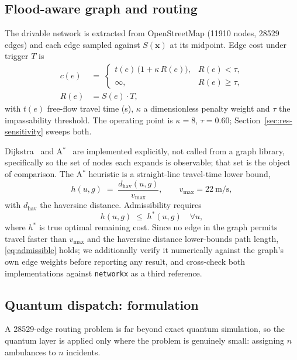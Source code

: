 \documentclass[10pt,twocolumn]{article}
\newcommand{\Sx}{S(\mathbf{x})}
\begin{document}
\subsection{Flood-aware graph and routing}
\label{sec:method-routing}
The drivable network is extracted from OpenStreetMap (\num{11910} nodes,
\num{28529} edges) and each edge sampled against $\Sx$ at its midpoint. Edge cost
under trigger $T$ is
\begin{align}
c(e) \;&=\;
\begin{cases}
t(e)\,\bigl(1+\kappa\,R(e)\bigr), & R(e) < \tau,\\[2pt]
\infty, & R(e) \ge \tau,
\end{cases} \nonumber\\[2pt]
R(e) &= S(e)\cdot T,
\label{eq:edgecost}
\end{align}
with $t(e)$ free-flow travel time (\si{\second}), $\kappa$ a dimensionless
penalty weight and $\tau$ the impassability threshold. The operating point is
$\kappa=8$, $\tau=0.60$; Section~\ref{sec:res-sensitivity} sweeps both.

Dijkstra~\citep{dijkstra1959} and A$^\ast$~\citep{hart1968} are implemented
explicitly, not called from a graph library, specifically so the set of
nodes each expands is observable; that set is the object of comparison. The
A$^\ast$ heuristic is a straight-line travel-time lower bound,
\begin{equation}
h(u,g) \;=\; \frac{d_{\mathrm{hav}}(u,g)}{v_{\max}},
\qquad v_{\max}=\SI{22}{\metre\per\second},
\label{eq:heuristic}
\end{equation}
with $d_{\mathrm{hav}}$ the haversine distance. Admissibility requires
\begin{equation}
h(u,g) \;\le\; h^{*}(u,g) \quad \forall u,
\label{eq:admissible}
\end{equation}
where $h^{*}$ is true optimal remaining cost. Since no edge in the graph permits
travel faster than $v_{\max}$ and the haversine distance lower-bounds path
length, \eqref{eq:admissible} holds; we additionally verify it numerically
against the graph's own edge weights before reporting any result, and cross-check
both implementations against \texttt{networkx} as a third reference.

\subsection{Quantum dispatch: formulation}
\label{sec:method-qaoa}
A \num{28529}-edge routing problem is far beyond exact quantum simulation, so the
quantum layer is applied only where the problem is genuinely small: assigning
$n$ ambulances to $n$ incidents.
\end{document}
